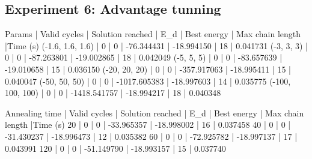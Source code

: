 \subsection{Experiment 6: Advantage tunning}





Params	| Valid cycles	| Solution reached	| E_d	| Best energy	| Max chain length	|Time (s)
(-1.6, 1.6, 1.6)	| 0		| 0			| -76.344431	| -18.994150	| 18		| 0.041731
(-3, 3, 3)	| 0		| 0			| -87.263801	| -19.002865	| 18		| 0.042049
(-5, 5, 5)	| 0		| 0			| -83.657639	| -19.010658	| 15		| 0.036150
(-20, 20, 20)	| 0		| 0			| -357.917063	| -18.995411	| 15		| 0.040047
(-50, 50, 50)	| 0		| 0			| -1017.605383	| -18.997603	| 14		| 0.035775
(-100, 100, 100)	| 0		| 0			| -1418.541757	| -18.994217	| 18		| 0.040348




Annealing time	| Valid cycles	| Solution reached	| E_d	| Best energy	| Max chain length	|Time (s)
20	| 0		| 0			| -33.965357	| -18.998002	| 16		| 0.037458
40	| 0		| 0			| -31.430237	| -18.996473	| 12		| 0.035382
60	| 0		| 0			| -72.925782	| -18.997137	| 17		| 0.043991
120	| 0		| 0			| -51.149790	| -18.993157	| 15		| 0.037740


